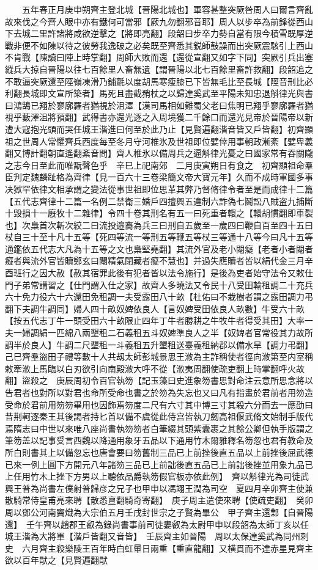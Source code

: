 　　五年春正月庚申朔齊主登北城【晉陽北城也】軍容甚整突厥咎周人曰爾言齊亂故來伐之今齊人眼中亦有鐵何可當邪【厥九勿翻邪音耶】周人以步卒為前鋒從西山下去城二里許諸將咸欲逆擊之【將即亮翻】段韶曰步卒力勢自當有限今積雪既厚逆戰非便不如陳以待之彼勞我逸破之必矣既至齊悉其鋭師鼓譟而出突厥震駭引上西山不肯戰【陳讀曰陣上時掌翻】周師大敗而還【還從宣翻又如字下同】突厥引兵出塞縱兵大掠自晉陽以往七百餘里人畜無遺【謂晉陽以北七百餘里畜許救翻】段韶追之不敢逼突厥還至陘嶺凍滑乃鋪氈以度胡馬寒瘦膝已下皆無毛比至長城【陘音刑比必利翻長城即文宣所築者】馬死且盡截矟杖之以歸達奚武至平陽未知忠退斛律光與書曰鴻鵠已翔於寥廓羅者猶視於沮澤【漢司馬相如難蜀父老曰焦明已翔乎寥廓羅者猶視乎藪澤沮將預翻】武得書亦還光逐之入周境獲二千餘口而還光見帝於晉陽帝以新遭大寇抱光頭而哭任城王湝進曰何至於此乃止【見賢遍翻湝音皆又戶皆翻】初齊顯祖之世周人常懼齊兵西度每至冬月守河椎氷及世祖即位嬖倖用事朝政漸紊【嬖卑義翻又博計翻朝直遙翻紊音問】齊人椎氷以備周兵之逼斛律光憂之曰國家常有吞關隴之志今日至此而唯翫聲色乎　辛巳上祀南郊　二月庚寅朔日有食之　初齊顯祖命羣臣刋定魏麟趾格為齊律【見一百六十三卷梁簡文帝大寶元年】久而不成時軍國多事决獄罕依律文相承謂之變法從事世祖即位思革其弊乃督脩律令者至是而成律十二篇【五代志齊律十二篇一名例二禁衛三婚戶四擅興五違制六詐偽七鬬訟八賊盗九捕斷十毁損十一廐牧十二雜律】令四十卷其刑名有五一曰死重者轘之【轘胡慣翻即車裂也】次梟首次斬次絞二曰流投邉裔為兵三曰刑自五歲至一歲四曰鞭自百至四十五曰杖自三十至十凡十五等【死四等流一等刑五等鞭五等杖三等通十八等今曰凡十五等通鑑依五代志大凡為十五等之文也梟堅堯翻】其流外官及老小閹癡【老者小者閹者癡者與流外官皆贖鄭玄曰閹精氣閉藏者癡不慧也】并過失應贖者皆以絹代金三月辛酉班行之因大赦【赦其宿罪此後有犯者皆以法令施行】是後為吏者始守法令又敕仕門子弟常講習之【仕門謂入仕之家】故齊人多曉法又令民十八受田輸租調二十充兵六十免力役六十六還田免租調一夫受露田八十畝【杜佑曰不栽樹者謂之露田調力弔翻下夫調牛調同】婦人四十畝奴婢依良人【言奴婢受田依良人畝數】牛受六十畝【按五代志丁牛一頭受田六十畝限止四年丁牛者勝耕之牛牧牛者得受其田】大率一夫一婦調絹一匹綿八兩墾租二石義租五斗奴婢準良人之半【奴婢者官常役其力故所調半於良人】牛調二尺墾租一斗義租五升墾租送臺義租納郡以備水旱【調力弔翻】　己巳齊羣盜田子禮等數十人共刼太師彭城景思王浟為主詐稱使者徑向浟第至内室稱敕牽浟上馬臨以白刃欲引向南殿浟大呼不從【浟夷周翻使疏吏翻上時掌翻呼火故翻】盜殺之　庚辰周初令百官執笏【記玉藻曰史進象笏書思對命注云意所思念將以告君者也對所以對君也命所受命也書之於笏為失忘也又曰凡有指畫於君前者用笏造受命於君前用笏笏畢用也因飾焉笏度二尺有六寸其中博三寸其殺六分而去一應劭曰昔荆軻逐秦王其後謁者持匕首以備不虞從此侍宫皆執刀劒高祖偃武脩文始制手版代焉隋志曰中世以來唯八座尚書執笏笏者白筆綴其頭紫囊裹之其餘公卿但執手版謂之筆笏盖以記事受言西魏以降通用象牙五品以下通用竹木爾雅釋名笏忽也君有教命及所白則書其上以備忽忘也唐會要曰笏舊制三品已上前挫後直五品以上前挫後屈武德已來一例上圓下方開元八年諸笏三品已上前詘後直五品已上前詘後挫並用象九品已上任用竹木上挫下方男以上聽依品爵執笏假官板亦依此例】　齊以斛律光為司徒武興王普為尚書左僕射普歸彦之兄子也甲申以馮翊王潤為司空　夏四月辛卯齊主使兼散騎常侍皇甫亮來聘【散悉亶翻騎奇寄翻】　庚子周主遣使來聘【使疏吏翻】　癸卯周以鄧公河南竇熾為大宗伯五月壬戌封世宗之子賢為畢公　甲子齊主還鄴【自晉陽還】　壬午齊以趙郡王叡為錄尚書事前司徒婁叡為太尉甲申以段韶為太師丁亥以任城王湝為大將軍【湝戶皆翻又音皆】　壬辰齊主如晉陽　周以太保達奚武為同州刺史　六月齊主殺樂陵王百年時白虹暈日兩重【重直龍翻】又横貫而不達赤星見齊主欲以百年猒之【見賢遍翻猒